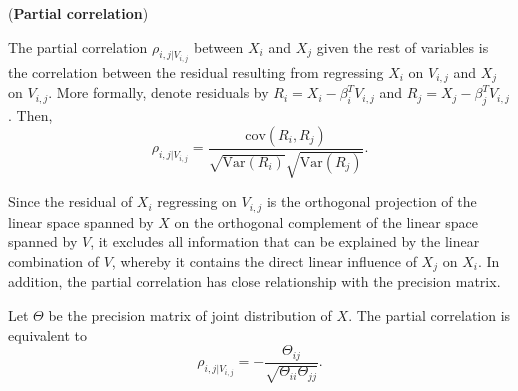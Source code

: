 \begin{definition}(\textbf{Partial correlation})
    
    The partial correlation $\rho_{i,j|V_{i,j}}$ between $X_i$ and $X_j$ given the rest of variables
    is the correlation between the residual resulting from regressing $X_i$ on $V_{i,j}$ and $X_j$ on $V_{i,j}$. 
    More formally, denote residuals by $R_i=X_i-\beta_i^TV_{i,j}$ and $R_j=X_j-\beta^T_jV_{i,j}$. 
    Then, 
    \begin{equation}
        \label{eq: ch1_pcorrdef}
        \rho_{i,j|V_{i,j}} = \frac{\text{cov}(R_i,R_j)}{\sqrt{\text{Var}(R_i)}\sqrt{\text{Var}(R_j)}}.
    \end{equation} 
\end{definition}

Since the residual of $X_i$ regressing on $V_{i,j}$ is the orthogonal projection of the linear space spanned by $X$ on the orthogonal complement of the linear space spanned by $V$, 
it excludes all information that can be explained by the linear combination of $V$, 
whereby it contains the direct linear influence of $X_j$ on $X_i$. 
In addition, the partial correlation has close relationship with the precision matrix. 
\begin{proposition}
    \label{prop: ch1_pcorr}
    Let $\Theta$ be the precision matrix of joint distribution of $X$.
    The partial correlation is equivalent to
    \begin{equation*}
        \rho_{i,j|V_{i,j}}=-\frac{\Theta_{ij}}{\sqrt{\Theta_{ii}\Theta_{jj}}}.
    \end{equation*}
\end{proposition}
